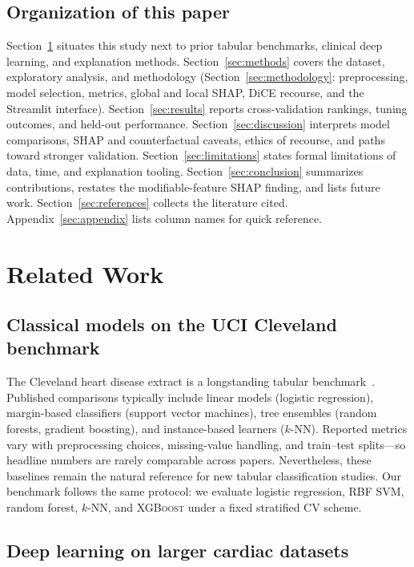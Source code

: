 \documentclass[11pt,a4paper]{article}
\begin{document}
\subsection{Organization of this paper}

Section~\ref{sec:related} situates this study next to prior tabular benchmarks, clinical deep learning, and explanation methods. Section~\ref{sec:methods} covers the dataset, exploratory analysis, and methodology (Section~\ref{sec:methodology}: preprocessing, model selection, metrics, global and local SHAP, DiCE recourse, and the Streamlit interface). Section~\ref{sec:results} reports cross-validation rankings, tuning outcomes, and held-out performance. Section~\ref{sec:discussion} interprets model comparisons, SHAP and counterfactual caveats, ethics of recourse, and paths toward stronger validation. Section~\ref{sec:limitations} states formal limitations of data, time, and explanation tooling. Section~\ref{sec:conclusion} summarizes contributions, restates the modifiable-feature SHAP finding, and lists future work. Section~\ref{sec:references} collects the literature cited. Appendix~\ref{sec:appendix} lists column names for quick reference.

\section{Related Work}
\label{sec:related}

\subsection{Classical models on the UCI Cleveland benchmark}

The Cleveland heart disease extract is a longstanding tabular benchmark~\cite{uci,detrano}. Published comparisons typically include linear models (logistic regression), margin-based classifiers (support vector machines), tree ensembles (random forests, gradient boosting), and instance-based learners ($k$-NN). Reported metrics vary with preprocessing choices, missing-value handling, and train--test splits—so headline numbers are rarely comparable across papers. Nevertheless, these baselines remain the natural reference for new tabular classification studies. Our benchmark follows the same protocol: we evaluate logistic regression, RBF SVM, random forest, $k$-NN, and \textsc{XGBoost} under a fixed stratified CV scheme.

\subsection{Deep learning on larger cardiac datasets}
\end{document}
